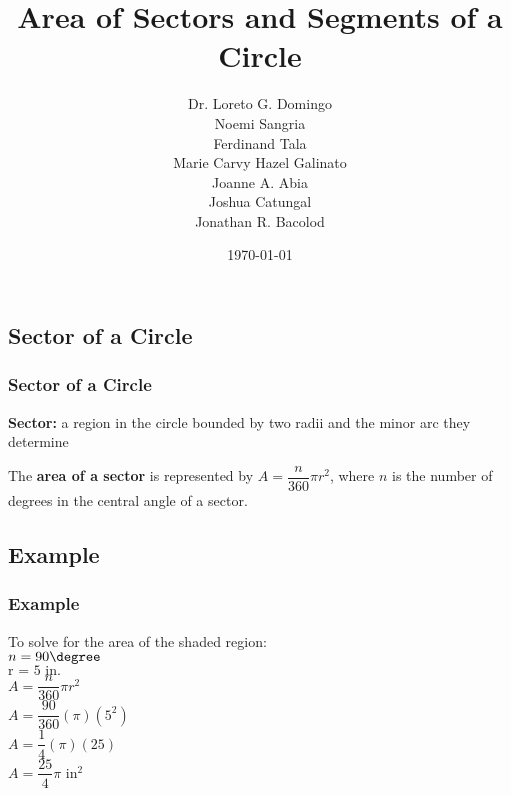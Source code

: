 \documentclass{beamer}
\title{Area of Sectors and Segments of a Circle}
\author{Dr. Loreto G. Domingo\\
Noemi Sangria\\
Ferdinand Tala\\
Marie Carvy Hazel Galinato\\
Joanne A. Abia\\
Joshua Catungal\\
Jonathan R. Bacolod}
\institute{Sauyo High School}
\date{\today}
\begin{document}
 

\begin{frame} 
\titlepage 
\end{frame}


\begin{frame} 
\section{Sector of a Circle} 
\frametitle{Sector of a Circle} 
\textbf{Sector:} a region in the circle bounded by two radii and the minor arc they determine

\vspce 

The \textbf{area of a sector} is represented by $A = \dfrac{n}{360}\pi r^2$, where $n$ is the number of degrees in the central angle of a sector.
\begin{center}
 
\end{center} 
\end{frame}

\begin{frame} 
\subsection{Example}
\frametitle{Example} 
\vspace*{-2cm}
To solve for the area of the shaded region: \\
$n=90 \degree $\\
$\text{r = 5 in.}$\\
$A = \dfrac{n}{360}\pi r^2$\\
$A = \dfrac{90}{360}(\pi)(5^2)$\\
$A = \dfrac{1}{4}(\pi)(25)$\\
$A=\dfrac{25}{4}\pi$ in$^2$

\vspace*{-2.5cm}\hspace*{7.5cm} 
\end{frame}
\end{document}
